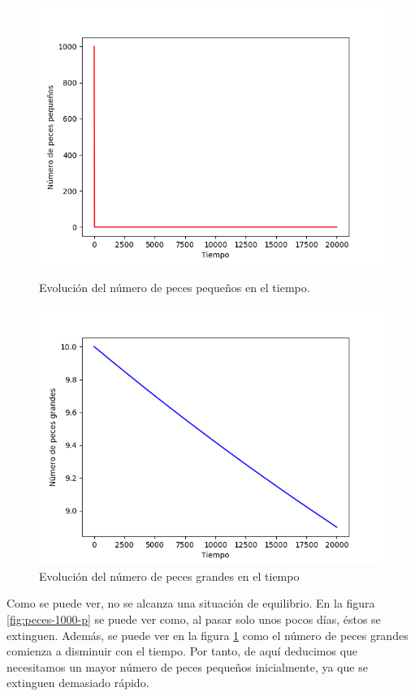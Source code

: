 \documentclass[11pt,a4paper]{report}
\begin{document}
\begin{figure}[H]
\centering
\begin{minipage}{.5\textwidth}
  \centering
  \includegraphics[scale=0.4]{img/peces-1000-1.png}
  \caption{Evolución del número de peces pequeños en el tiempo.}
  \label{fig:peces-1000-p}
\end{minipage}%
\begin{minipage}{.5\textwidth}
  \centering
  \includegraphics[scale=0.4]{img/peces-1000-2.png}
  \caption{Evolución del número de peces grandes en el tiempo}
  \label{fig:peces-1000-g}
\end{minipage}
\end{figure}

Como se puede ver, no se alcanza una situación de equilibrio. En la figura \ref{fig:peces-1000-p} se puede ver como, al pasar
solo unos pocos días, éstos se extinguen. Además, se puede ver en la figura \ref{fig:peces-1000-g} como el número de peces
grandes comienza a disminuir con el tiempo. Por tanto, de aquí deducimos que necesitamos un mayor número de peces pequeños
inicialmente, ya que se extinguen demasiado rápido.
\end{document}
